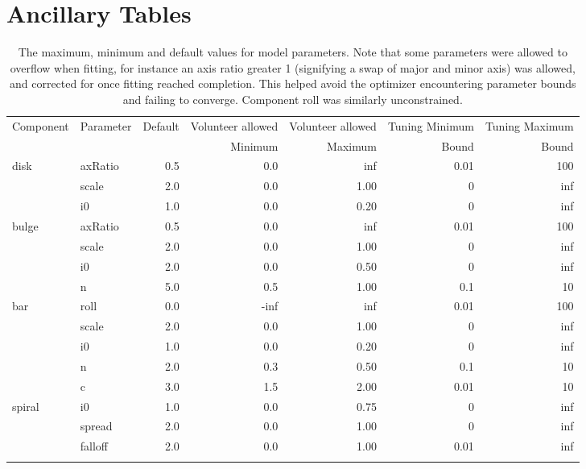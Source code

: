 \documentclass[../main.tex]{subfiles}
\begin{document}
\section{Ancillary Tables}
\begin{table}
  \centering
  \caption{The maximum, minimum and default values for model parameters. Note that some parameters were allowed to overflow when fitting, for instance an axis ratio greater 1 (signifying a swap of major and minor axis) was allowed, and corrected for once fitting reached completion. This helped avoid the optimizer encountering parameter bounds and failing to converge. Component roll was similarly unconstrained.}
  \begin{tabular}{l|l|r|r|r|r|r}
\hline
Component & Parameter &  Default &  Volunteer allowed &  Volunteer allowed & Tuning Minimum & Tuning Maximum \\
 &  &   &  Minimum &  Maximum & Bound & Bound \\
\hline
disk & axRatio   &      0.5 &       0.0 &      inf &       0.01   & 100   \\
       & scale   &      2.0 &       0.0 &     1.00 &       0      & inf   \\
       & i0      &      1.0 &       0.0 &     0.20 &       0      & inf   \\
bulge & axRatio  &      0.5 &       0.0 &      inf &       0.01   & 100   \\
       & scale   &      2.0 &       0.0 &     1.00 &       0      & inf   \\
       & i0      &      2.0 &       0.0 &     0.50 &       0      & inf   \\
       & n       &      5.0 &       0.5 &     1.00 &       0.1    & 10    \\
bar & roll       &      0.0 &      -inf &      inf &       0.01   & 100   \\
       & scale   &      2.0 &       0.0 &     1.00 &       0      & inf   \\
       & i0      &      1.0 &       0.0 &     0.20 &       0      & inf   \\
       & n       &      2.0 &       0.3 &     0.50 &       0.1    & 10    \\
       & c       &      3.0 &       1.5 &     2.00 &       0.01   & 10    \\
spiral & i0      &      1.0 &       0.0 &     0.75 &       0      & inf   \\
       & spread  &      2.0 &       0.0 &     1.00 &       0      & inf   \\
       & falloff &      2.0 &       0.0 &     1.00 &       0.01   & inf   \\
\hline
  \centering
  \end{tabular}
  \label{table:bad_values}
\end{table}
\end{document}

